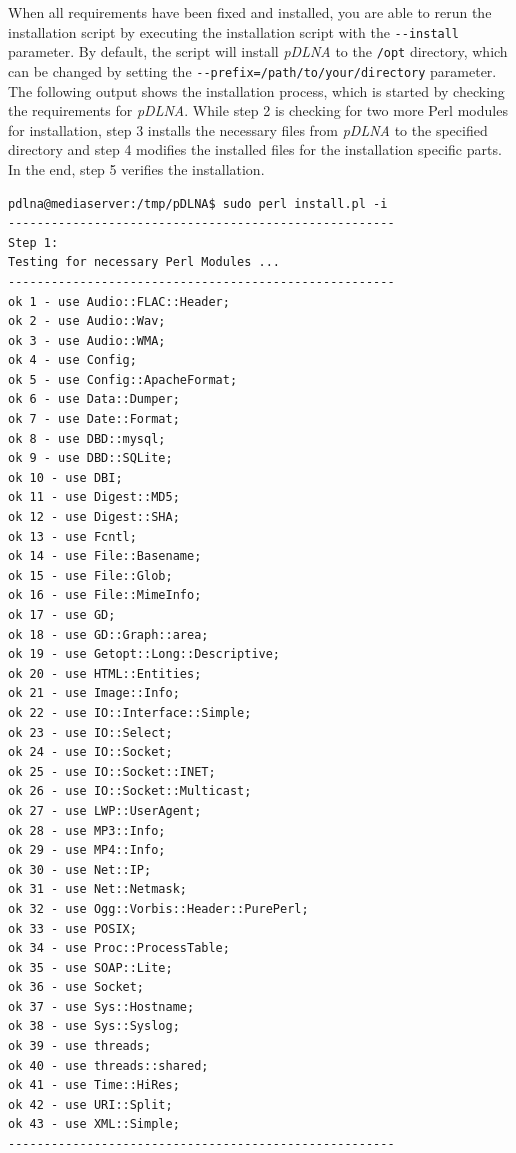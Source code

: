 \documentclass[a4paper,oneside,10pt]{report}
\newenvironment{colframecmd}{%
  \begin{Sbox}
    \begin{minipage}{.99\columnwidth}
}{%
  \end{minipage}
  \end{Sbox}
  \begin{center}
    \fcolorbox{black}{LightSteelBlue}{\TheSbox}
  \end{center}
}
\begin{document}
When all requirements have been fixed and installed, you are able to rerun the installation script by executing the installation script with the \verb|--install| parameter. By default, the script will install {\em pDLNA} to the \verb|/opt| directory, which can be changed by setting the \verb|--prefix=/path/to/your/directory| parameter. The following output shows the installation process, which is started by checking the requirements for {\em pDLNA}. While step 2 is checking for two more Perl modules for installation, step 3 installs the necessary files from {\em pDLNA} to the specified directory and step 4 modifies the installed files for the installation specific parts. In the end, step 5 verifies the installation.
\begin{colframecmd}
\begin{verbatim}
pdlna@mediaserver:/tmp/pDLNA$ sudo perl install.pl -i
------------------------------------------------------
Step 1:
Testing for necessary Perl Modules ...
------------------------------------------------------
ok 1 - use Audio::FLAC::Header;
ok 2 - use Audio::Wav;
ok 3 - use Audio::WMA;
ok 4 - use Config;
ok 5 - use Config::ApacheFormat;
ok 6 - use Data::Dumper;
ok 7 - use Date::Format;
ok 8 - use DBD::mysql;
ok 9 - use DBD::SQLite;
ok 10 - use DBI;
ok 11 - use Digest::MD5;
ok 12 - use Digest::SHA;
ok 13 - use Fcntl;
ok 14 - use File::Basename;
ok 15 - use File::Glob;
ok 16 - use File::MimeInfo;
ok 17 - use GD;
ok 18 - use GD::Graph::area;
ok 19 - use Getopt::Long::Descriptive;
ok 20 - use HTML::Entities;
ok 21 - use Image::Info;
ok 22 - use IO::Interface::Simple;
ok 23 - use IO::Select;
ok 24 - use IO::Socket;
ok 25 - use IO::Socket::INET;
ok 26 - use IO::Socket::Multicast;
ok 27 - use LWP::UserAgent;
ok 28 - use MP3::Info;
ok 29 - use MP4::Info;
ok 30 - use Net::IP;
ok 31 - use Net::Netmask;
ok 32 - use Ogg::Vorbis::Header::PurePerl;
ok 33 - use POSIX;
ok 34 - use Proc::ProcessTable;
ok 35 - use SOAP::Lite;
ok 36 - use Socket;
ok 37 - use Sys::Hostname;
ok 38 - use Sys::Syslog;
ok 39 - use threads;
ok 40 - use threads::shared;
ok 41 - use Time::HiRes;
ok 42 - use URI::Split;
ok 43 - use XML::Simple;
------------------------------------------------------
\end{verbatim}
\end{colframecmd}
\end{document}
